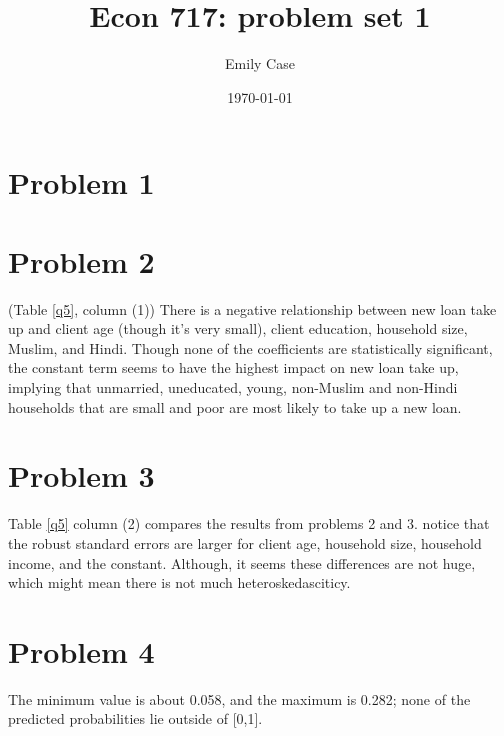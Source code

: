 \documentclass[11pt]{article}
\title{Econ 717: problem set 1}
\author{Emily Case}
\date{\today}
\newcommand{\tabref}[1]{Table \ref{#1}}
\begin{document}
\maketitle


\section*{Problem 1}



\section*{Problem 2}
(\tabref{q5}, column (1)) There is a negative relationship between new loan take up and client age (though it's very small), client education, household size, Muslim, and Hindi. Though none of the coefficients are statistically significant, the constant term seems to have the highest impact on new loan take up, implying that unmarried, uneducated, young, non-Muslim and non-Hindi households that are small and poor are most likely to take up a new loan. 
% 



\section*{Problem 3}
Table \ref{q5} column (2)  compares the results from problems 2 and 3. notice that the robust standard errors are larger for client age, household size, household income, and the constant. Although, it seems these differences are not huge, which might mean there is not much heteroskedasciticy.
%



\section*{Problem 4}
The minimum value is about 0.058, and the maximum is 0.282; none of the predicted probabilities lie outside of [0,1].
\end{document}

